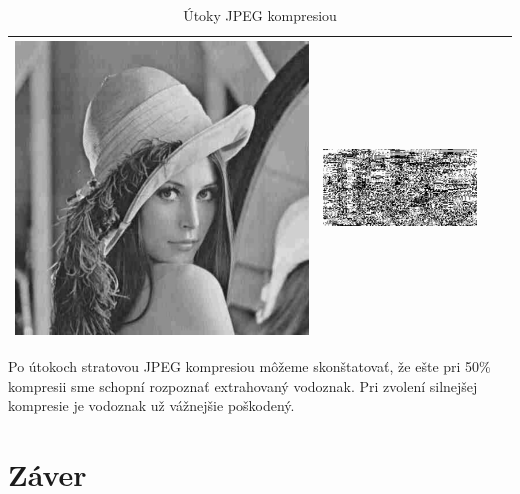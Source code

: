 \begin{table}[h]
\begin{tabular}{llcc}
\begin{minipage}[c]{.1\textwidth}
  \includegraphics[scale=0.1]{obrazky/jpeg20}
\end{minipage} &
 \begin{minipage}[c]{.15\textwidth}
   \includegraphics[scale=0.25]{obrazky/jpeg20-wm}
 \end{minipage}  \\ \hline
\end{tabular}
\caption{Útoky JPEG kompresiou}
\end{table}

Po útokoch stratovou JPEG kompresiou môžeme skonštatovať, že ešte pri 50\% kompresii sme schopní rozpoznať extrahovaný vodoznak. Pri zvolení silnejšej kompresie je vodoznak už vážnejšie poškodený.

\chapter{Záver}